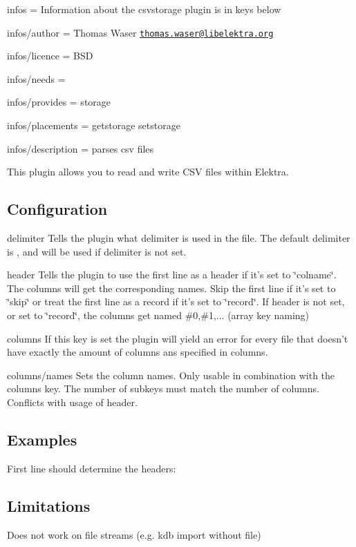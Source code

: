 
\begin{DoxyItemize}
\item infos = Information about the csvstorage plugin is in keys below
\item infos/author = Thomas Waser \href{mailto:thomas.waser@libelektra.org}{\tt thomas.\+waser@libelektra.\+org}
\item infos/licence = B\+S\+D
\item infos/needs =
\item infos/provides = storage
\item infos/placements = getstorage setstorage
\item infos/description = parses csv files
\end{DoxyItemize}

This plugin allows you to read and write C\+S\+V files within Elektra.

\subsection*{Configuration}

{\ttfamily delimiter} Tells the plugin what delimiter is used in the file. The default delimiter is {\ttfamily ,} and will be used if {\ttfamily delimiter} is not set.

{\ttfamily header} Tells the plugin to use the first line as a header if it's set to \char`\"{}colname\char`\"{}. The columns will get the corresponding names. Skip the first line if it's set to \char`\"{}skip\char`\"{} or treat the first line as a record if it's set to \char`\"{}record\char`\"{}. If {\ttfamily header} is not set, or set to \char`\"{}record\char`\"{}, the columns get named \#0,\#1,... (array key naming)

{\ttfamily columns} If this key is set the plugin will yield an error for every file that doesn't have exactly the amount of columns ans specified in {\ttfamily columns}.

{\ttfamily columns/names} Sets the column names. Only usable in combination with the {\ttfamily columns} key. The number of subkeys must match the number of columns. Conflicts with usage of {\ttfamily header}.

\subsection*{Examples}

First line should determine the headers\+: 


\subsection*{Limitations}


\begin{DoxyItemize}
\item Does not work on file streams (e.\+g. {\ttfamily kdb import} without file) 
\end{DoxyItemize}